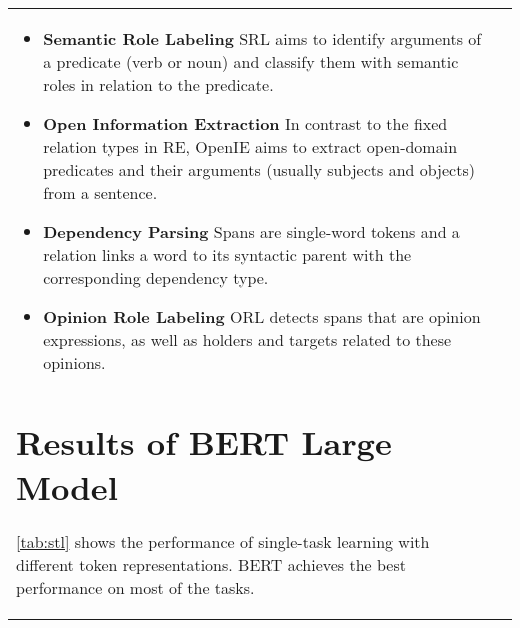 \documentclass[11pt,a4paper]{article}
\begin{document}
\begin{table*}[tb]
\begin{subtable}[t]{0.47\textwidth}
{\begin{tabular}[t]{ll}
\begin{itemize}[leftmargin=10pt]
\begin{itemize}[leftmargin=8pt]
\item \textbf{Semantic Role Labeling} \citep{gildea:2002:srl} SRL aims to identify arguments of a predicate (verb or noun) and classify them with semantic roles in relation to the predicate.
\item \textbf{Open Information Extraction} \citep{banko:07:openie,niklaus-etal-2018-survey} In contrast to the fixed relation types in RE, OpenIE aims to extract open-domain predicates and their arguments (usually subjects and objects) from a sentence.
\item \textbf{Dependency Parsing} \citep{kubler2009dependency} Spans are single-word tokens and a relation links a word to its syntactic parent with the corresponding dependency type. 
\item \textbf{Opinion Role Labeling} \citep{yang:13:fgoe} 
ORL detects spans that are opinion expressions, as well as holders and targets related to these opinions.
\end{itemize}
\end{itemize}

\section{Results of BERT Large Model}\label{ap:bertlarge}

\autoref{tab:stl} shows the performance of single-task learning with different token representations.
BERT achieves the best performance on most of the tasks.


\end{tabular}}
\end{subtable}
\end{table*}
\end{document}
